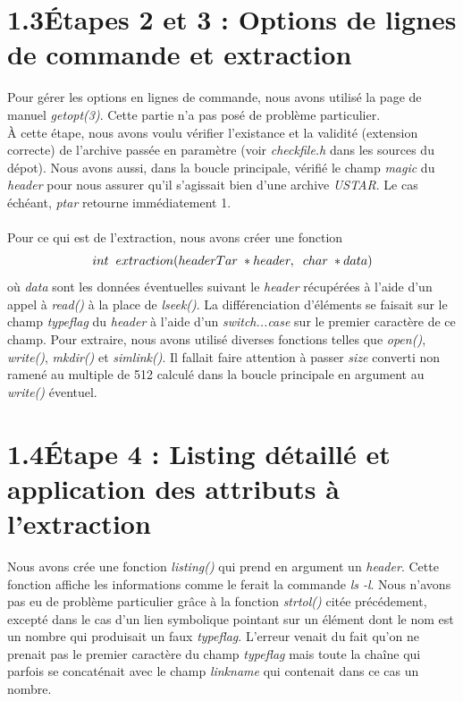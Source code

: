\documentclass[12pt, a4paper]{report}
\begin{document}
\section*{\hspace{0.6cm}1.3\hspace{0.6cm}Étapes 2 et 3 : Options de lignes de commande et extraction}
\hspace{1cm}Pour gérer les options en lignes de commande, nous avons utilisé la page de manuel \textit{getopt(3)}. Cette partie n'a pas posé de problème particulier.\\

\hspace{0.5cm}À cette étape, nous avons voulu vérifier l'existance et la validité (extension correcte) de l'archive passée en paramètre (voir \textit{checkfile.h} dans les sources du dépot). Nous avons aussi, dans la boucle principale, vérifié le champ \textit{magic} du \textit{header} pour nous assurer qu'il s'agissait bien d'une archive \textit{USTAR}. Le cas échéant, \textit{ptar} retourne immédiatement 1.\\
\\

\hspace{0.5cm}Pour ce qui est de l'extraction, nous avons créer une fonction \[int\hspace{0.2cm}extraction(headerTar\hspace{0.1cm}*header,\hspace{0.2cm}char\hspace{0.1cm}*data)\] où \textit{data} sont les données éventuelles suivant le \textit{header} récupérées à l'aide d'un appel à \textit{read()} à la place de \textit{lseek()}. La différenciation d'éléments se faisait sur le champ \textit{typeflag} du \textit{header} à l'aide d'un \textit{switch...case} sur le premier caractère de ce champ. Pour extraire, nous avons utilisé diverses fonctions telles que \textit{open()}, \textit{write()}, \textit{mkdir()} et \textit{simlink()}. Il fallait faire attention à passer \textit{size} converti non ramené au multiple de 512 calculé dans la boucle principale en argument au \textit{write()} éventuel.

\section*{\hspace{0.6cm}1.4\hspace{0.6cm}Étape 4 : Listing détaillé et application des attributs à l'extraction}
\hspace{1cm}Nous avons crée une fonction \textit{listing()} qui prend en argument un \textit{header}. Cette fonction affiche les informations comme le ferait la commande \textit{ls -l}. Nous n'avons pas eu de problème particulier grâce à la fonction \textit{strtol()} citée précédement, excepté dans le cas d'un lien symbolique pointant sur un élément dont le nom est un nombre qui produisait un faux \textit{typeflag}. L'erreur venait du fait qu'on ne prenait pas le premier caractère du champ \textit{typeflag} mais toute la chaîne qui parfois se concaténait avec le champ \textit{linkname} qui contenait dans ce cas un nombre.\\
\end{document}
